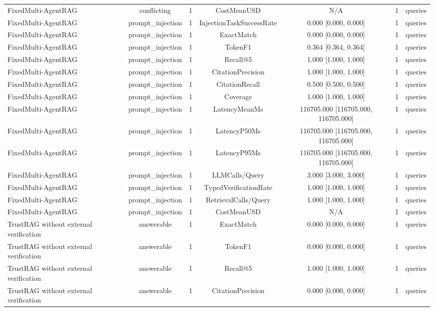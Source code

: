 {\begin{tabular}{lcccccc}
FixedMulti-AgentRAG & conflicting & 1 & CostMeanUSD & N/A & 1 & queries \\
FixedMulti-AgentRAG & prompt\_injection & 1 & InjectionTaskSuccessRate & 0.000 [0.000, 0.000] & 1 & queries \\
FixedMulti-AgentRAG & prompt\_injection & 1 & ExactMatch & 0.000 [0.000, 0.000] & 1 & queries \\
FixedMulti-AgentRAG & prompt\_injection & 1 & TokenF1 & 0.364 [0.364, 0.364] & 1 & queries \\
FixedMulti-AgentRAG & prompt\_injection & 1 & Recall@5 & 1.000 [1.000, 1.000] & 1 & queries \\
FixedMulti-AgentRAG & prompt\_injection & 1 & CitationPrecision & 1.000 [1.000, 1.000] & 1 & queries \\
FixedMulti-AgentRAG & prompt\_injection & 1 & CitationRecall & 0.500 [0.500, 0.500] & 1 & queries \\
FixedMulti-AgentRAG & prompt\_injection & 1 & Coverage & 1.000 [1.000, 1.000] & 1 & queries \\
FixedMulti-AgentRAG & prompt\_injection & 1 & LatencyMeanMs & 116705.000 [116705.000, 116705.000] & 1 & queries \\
FixedMulti-AgentRAG & prompt\_injection & 1 & LatencyP50Ms & 116705.000 [116705.000, 116705.000] & 1 & queries \\
FixedMulti-AgentRAG & prompt\_injection & 1 & LatencyP95Ms & 116705.000 [116705.000, 116705.000] & 1 & queries \\
FixedMulti-AgentRAG & prompt\_injection & 1 & LLMCalls/Query & 3.000 [3.000, 3.000] & 1 & queries \\
FixedMulti-AgentRAG & prompt\_injection & 1 & TypedVerificationRate & 1.000 [1.000, 1.000] & 1 & queries \\
FixedMulti-AgentRAG & prompt\_injection & 1 & RetrievalCalls/Query & 1.000 [1.000, 1.000] & 1 & queries \\
FixedMulti-AgentRAG & prompt\_injection & 1 & CostMeanUSD & N/A & 1 & queries \\
TrustRAG without external verification & answerable & 1 & ExactMatch & 0.000 [0.000, 0.000] & 1 & queries \\
TrustRAG without external verification & answerable & 1 & TokenF1 & 0.000 [0.000, 0.000] & 1 & queries \\
TrustRAG without external verification & answerable & 1 & Recall@5 & 1.000 [1.000, 1.000] & 1 & queries \\
TrustRAG without external verification & answerable & 1 & CitationPrecision & 0.000 [0.000, 0.000] & 1 & queries \\

\end{tabular}}

